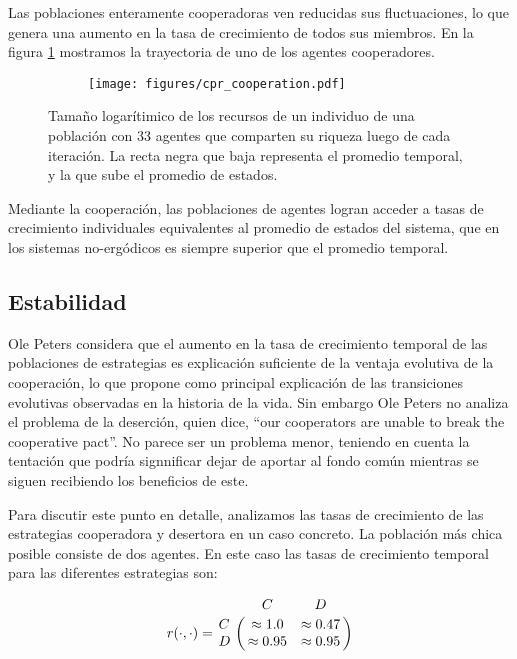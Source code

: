\documentclass[a4paper,10pt]{article}
\begin{document}
Las poblaciones enteramente cooperadoras ven reducidas sus fluctuaciones, lo que genera una aumento en la tasa de crecimiento de todos sus miembros.
En la figura \ref{fig:cpr_cooperation} mostramos la trayectoria de uno de los agentes cooperadores.
\begin{figure}[H]
    \centering
    \begin{subfigure}[b]{0.45\textwidth}
    \texttt{[image: figures/cpr\_cooperation.pdf]}
    \end{subfigure}
    \caption{
    Tamaño logarítimico de los recursos de un individuo de una población con 33 agentes que comparten su riqueza luego de cada iteración.
    La recta negra que baja representa el promedio temporal, y la que sube el promedio de estados.
    }
    \label{fig:cpr_cooperation}
\end{figure}

Mediante la cooperación, las poblaciones de agentes logran acceder a tasas de crecimiento individuales equivalentes al promedio de estados del sistema, que en los sistemas no-ergódicos es siempre superior que el promedio temporal.

\subsection{Estabilidad}

Ole Peters considera que el aumento en la tasa de crecimiento temporal de las poblaciones de estrategias es explicación suficiente de la ventaja evolutiva de la cooperación, lo que propone como principal explicación de las transiciones evolutivas observadas en la historia de la vida.
Sin embargo Ole Peters no analiza el problema de la deserción, quien dice, ``our cooperators are unable to break the cooperative pact''.
No parece ser un problema menor, teniendo en cuenta la tentación que podría signnificar dejar de aportar al fondo común mientras se siguen recibiendo los beneficios de este.

Para discutir este punto en detalle, analizamos las tasas de crecimiento de las estrategias cooperadora y desertora en un caso concreto.
La población más chica posible consiste de dos agentes.
En este caso las tasas de crecimiento temporal para las diferentes estrategias son:

\begin{equation}
   r(\cdot,\cdot) = \bordermatrix{ & C & D \cr
      C & \approx 1.0 & \approx 0.47 \cr
      D & \approx 0.95 & \approx 0.95 } 
\end{equation}
\end{document}
